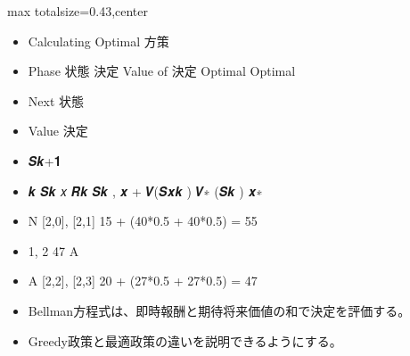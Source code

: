 \clearpage
{}
\begin{minipage}[t]{0.405\textwidth}
\begin{adjustbox}{max totalsize={\textwidth}{0.43\textheight},center}
\begin{minipage}{\textwidth}\scriptsize
{}\begin{itemize}
\item Calculating Optimal 方策
\item Phase 状態 決定 Value of 決定 Optimal Optimal
\item Next 状態
\item Value 決定
\item 𝑺𝒌+𝟏
\item 𝒌 𝑺𝒌 𝑥 𝑹𝒌 𝑺𝒌 , 𝒙 + 𝑽(𝑺𝒙𝒌 ) 𝑽∗ (𝑺𝒌 ) 𝒙∗
\item N [2,0], [2,1] 15 + (40*0.5 + 40*0.5) = 55
\item 1, 2 47 A
\item A [2,2], [2,3] 20 + (27*0.5 + 27*0.5) = 47
\end{itemize}\begin{itemize}
\item Bellman方程式は、即時報酬と期待将来価値の和で決定を評価する。
\item Greedy政策と最適政策の違いを説明できるようにする。
\end{itemize}
\end{minipage}
\end{adjustbox}
\end{minipage}\hfill
